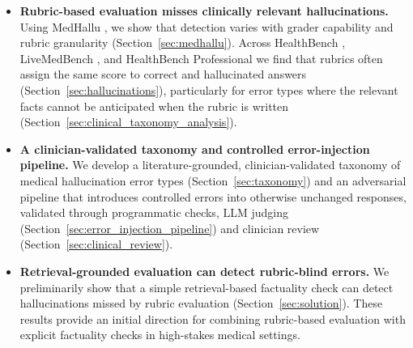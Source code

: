 \documentclass{article}
\begin{document}
\begin{itemize}
\item \textbf{Rubric-based evaluation misses clinically relevant hallucinations.} Using MedHallu \citep{pandit_medhallu_2025}, we show that detection varies with grader capability and rubric granularity (Section~\ref{sec:medhallu}). Across HealthBench \citep{arorahealthbench2025}, LiveMedBench \citep{yan_livemedbench_2026}, and HealthBench Professional \citep{hicks2026healthbench} we find that rubrics often assign the same score to correct and hallucinated answers (Section~\ref{sec:hallucinations}), particularly for error types where the relevant facts cannot be anticipated when the rubric is written (Section~\ref{sec:clinical_taxonomy_analysis}).
% 
\item \textbf{A clinician-validated taxonomy and controlled error-injection pipeline.} We develop a literature-grounded, clinician-validated 
taxonomy of medical hallucination error types (Section~\ref{sec:taxonomy}) and an adversarial pipeline that introduces controlled errors into otherwise unchanged responses, validated through programmatic checks, LLM judging (Section~\ref{sec:error_injection_pipeline}) and clinician review (Section~\ref{sec:clinical_review}).
% 
\item \textbf{Retrieval-grounded evaluation can detect rubric-blind errors.} We preliminarily show that a simple retrieval-based factuality check can detect hallucinations missed by rubric evaluation (Section~\ref{sec:solution}). These results provide an initial direction for combining rubric-based evaluation with explicit factuality checks in high-stakes medical settings.
\end{itemize}
\end{document}
